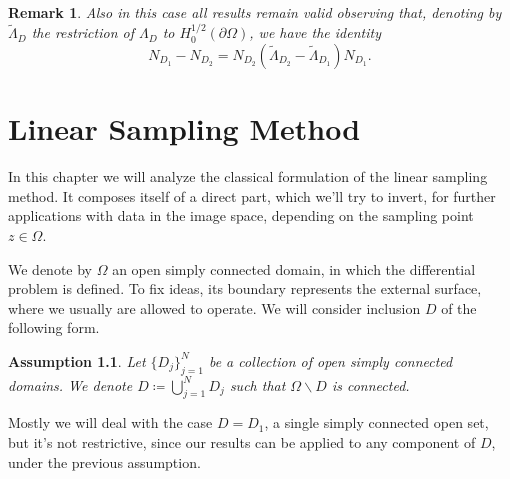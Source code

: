 \documentclass[10pt, a4paper, twoside, openright]{book}
\theoremstyle{definition}
\theoremstyle{plain}
\theoremstyle{plain}
\theoremstyle{plain}
\theoremstyle{plain}
\newtheorem{remark}[subsection]{Remark}
\theoremstyle{plain}
\theoremstyle{plain}
\theoremstyle{plain}
\newtheorem{assumption}[subsection]{Assumption}
\theoremstyle{plain}
\begin{document}
\begin{remark}
Also in this case all results remain valid observing  that, denoting by $\tilde\Lambda_D$ the restriction of 
$\Lambda_D$ to $H_0^{1/2}(\partial\Omega)$, we have the identity
$$N_{D_1}-N_{D_2}=N_{D_2}(\tilde\Lambda_{D_2}-\tilde\Lambda_{D_1})N_{D_1}.$$
\end{remark}


\chapter{Linear Sampling Method}
\label{ch:linear-sampling}
\begin{figure}[tb]
\begin{center}
\end{center}
\end{figure}
In this chapter we will analyze the classical formulation of the linear sampling method. It composes itself 
of a direct part, which we'll try to invert, for further applications with data in the image space, 
depending on the sampling point $z\in\Omega$.
\par
We denote by $\Omega$ an open simply connected domain, in which the differential problem is defined.
To fix ideas, its boundary represents the external surface, where we usually are allowed to operate.
We will consider inclusion $D$ of the following form.
\begin{assumption}
\label{assumption:connected}
 Let $\bigl\{D_j\bigr\}_{j=1}^N$ be a collection of open simply connected domains.
 We denote $D\coloneqq\bigcup_{j=1}^ND_j$ such that $\Omega\backslash D$ is connected.
\end{assumption}
Mostly we will deal with the case $D=D_1$, a single simply connected open set, but it's not restrictive, 
since our results can be applied to any component of $D$, under the previous assumption.
\end{document}
